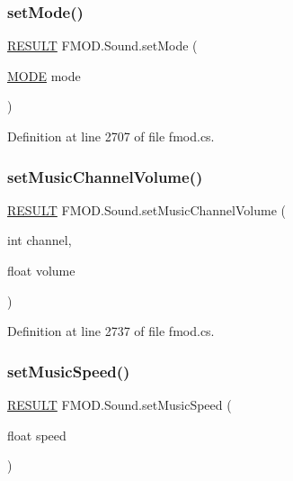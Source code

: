 \subsubsection{\texorpdfstring{set\+Mode()}{setMode()}}
{\footnotesize\ttfamily \hyperlink{namespace_f_m_o_d_a305d1176ef3f8c8815861a60407ac33d}{R\+E\+S\+U\+LT} F\+M\+O\+D.\+Sound.\+set\+Mode (\begin{DoxyParamCaption}\item[{\hyperlink{namespace_f_m_o_d_a94ab158a8314f5f4248f1aea55dbefa3}{M\+O\+DE}}]{mode }\end{DoxyParamCaption})}



Definition at line 2707 of file fmod.\+cs.

\mbox{\label{class_f_m_o_d_1_1_sound_a20cc54fcb0b5528c29d33f81e2086132}} 
\subsubsection{\texorpdfstring{set\+Music\+Channel\+Volume()}{setMusicChannelVolume()}}
{\footnotesize\ttfamily \hyperlink{namespace_f_m_o_d_a305d1176ef3f8c8815861a60407ac33d}{R\+E\+S\+U\+LT} F\+M\+O\+D.\+Sound.\+set\+Music\+Channel\+Volume (\begin{DoxyParamCaption}\item[{int}]{channel,  }\item[{float}]{volume }\end{DoxyParamCaption})}



Definition at line 2737 of file fmod.\+cs.

\mbox{\label{class_f_m_o_d_1_1_sound_a8646bed2b2cb7cb8fcd84398f0abef83}} 
\subsubsection{\texorpdfstring{set\+Music\+Speed()}{setMusicSpeed()}}
{\footnotesize\ttfamily \hyperlink{namespace_f_m_o_d_a305d1176ef3f8c8815861a60407ac33d}{R\+E\+S\+U\+LT} F\+M\+O\+D.\+Sound.\+set\+Music\+Speed (\begin{DoxyParamCaption}\item[{float}]{speed }\end{DoxyParamCaption})}



